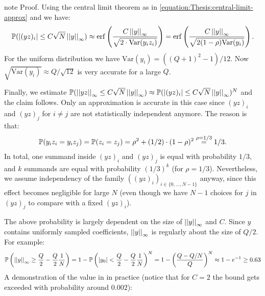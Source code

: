 \documentclass[letterpaper,10pt,english]{jupyterBook}
\begin{document}
\begin{sphinxadmonition}{note}
\sphinxAtStartPar
Proof. Using the central limit theorem as in \eqref{equation:Thesis:central-limit-approx} and {\hyperref[\detokenize{Thesis:uniform-times-ternary}]{}} we have:
\begin{equation*}
\begin{split}\P(\abs{(yz)_i} \le C\sqrt{N}\norm y) \approx \mathrm{erf} \left( \frac{C\norm y}{\sqrt{2\cdot \mathrm{Var}(y_iz_i)}}\right) = \mathrm{erf} \left( \frac{C\norm y}{\sqrt{2(1-\rho)\mathrm{Var}(y_i)}}\right).\end{split}
\end{equation*}
\sphinxAtStartPar
For the uniform distribution we have \(\mathrm{Var}(y_i) = ((Q+1)^2-1)/12\).
Now \(\sqrt{\mathrm{Var}(y_i)} \approx Q/\sqrt{12}\) is very accurate for a large \(Q\).

\sphinxAtStartPar
Finally, we estimate \(\P(\norm{yz} \le C\sqrt{N}\norm y) \approx \P(\abs{(yz)_i} \le C\sqrt N \norm y)^N\) and the claim follows.
Only an approximation is accurate in this case since \((yz)_i\) and \((yz)_j\) for \(i\neq j\) are not statistically independent anymore.
The reason is that:
\begin{equation*}
\begin{split}\P(y_iz_i =  y_i z_j) = \P(z_i = z_j) = \rho^2 + (1/2) \cdot (1-\rho)^2 \overset{\rho = 1/3}{=} 1/3.\end{split}
\end{equation*}
\sphinxAtStartPar
In total, one summand inside \((yz)_i\) and \((yz)_j\) is equal with probability \(1/3\), and \(k\) summands are equal with probability \((1/3)^k\) (for \(\rho = 1/3\)).
Nevertheless, we assume independency of the family \(((yz)_i)_{i \in \{0,\dots,N-1\}}\) anyway, since this effect becomes negligible for large \(N\) (even though we have \(N-1\) choices for \(j\) in \((yz)_j\) to compare with a fixed \((yz)_i\)).
\end{sphinxadmonition}

\sphinxAtStartPar
The above probability is largely dependent on the size of \(\norm y\) and \(C\).
Since \(y\) contains uniformly sampled coefficients, \(\norm y\) is regularly about the size of \(Q/2\).
For example:
\begin{equation*}
\begin{split}
\P\left(\norm y \ge \frac{Q}{2}-\frac{Q}{2}\frac{1}{N}\right) = 1 - \P\left(\abs {y_0} < \frac{Q}{2}-\frac{Q}{2}\frac{1}{N}\right)^N = 1 - \left(\frac{Q-Q/N}{Q}\right)^N \approx 1 - e^{-1} \ge 0.63
\end{split}
\end{equation*}
\sphinxAtStartPar
A demonstration of the value in {\hyperref[\detokenize{Thesis:multiplication-bound-uniform-ternary}]{}} in practice (notice that for \(C=2\) the bound gets exceeded with probability around \(0.002\)):
\end{document}
